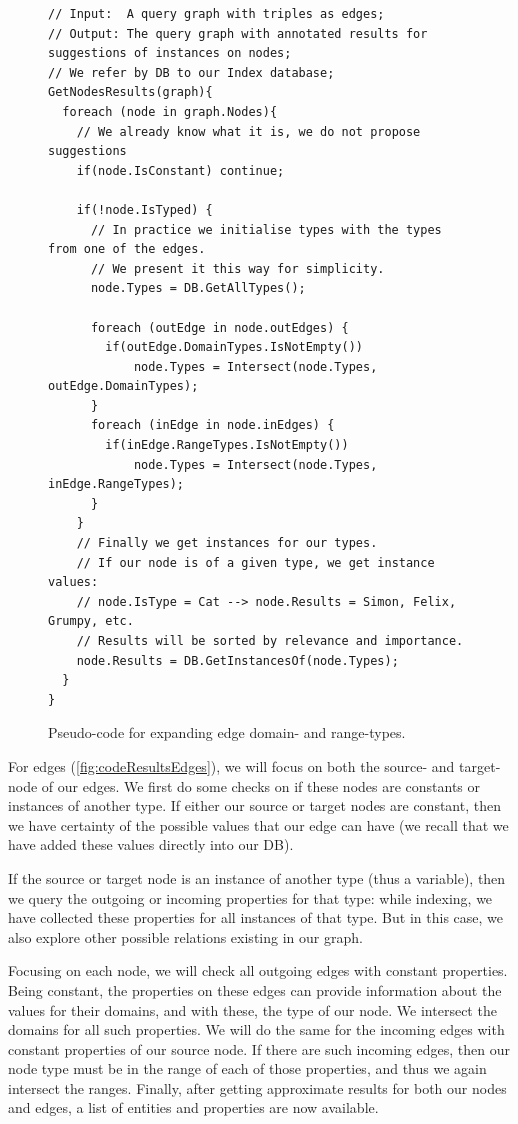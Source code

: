 \begin{example}
\begin{figure}[h]
\begin{verbatim}
// Input:  A query graph with triples as edges;
// Output: The query graph with annotated results for suggestions of instances on nodes;
// We refer by DB to our Index database;
GetNodesResults(graph){
  foreach (node in graph.Nodes){
    // We already know what it is, we do not propose suggestions
    if(node.IsConstant) continue;
        
    if(!node.IsTyped) {
      // In practice we initialise types with the types from one of the edges.
      // We present it this way for simplicity.
      node.Types = DB.GetAllTypes();
      
      foreach (outEdge in node.outEdges) {
        if(outEdge.DomainTypes.IsNotEmpty())
            node.Types = Intersect(node.Types, outEdge.DomainTypes);
      }
      foreach (inEdge in node.inEdges) {
        if(inEdge.RangeTypes.IsNotEmpty())
            node.Types = Intersect(node.Types, inEdge.RangeTypes);
      }
    }
    // Finally we get instances for our types.
    // If our node is of a given type, we get instance values:
    // node.IsType = Cat --> node.Results = Simon, Felix, Grumpy, etc.
    // Results will be sorted by relevance and importance.
    node.Results = DB.GetInstancesOf(node.Types);
  }
}
\end{verbatim}
\caption{Pseudo-code for expanding edge domain- and range-types.}
\label{fig:codeResultsNodes}
\end{figure}

For edges (\autoref{fig:codeResultsEdges}), we will focus on both the source- and target-node of our edges. We first do some checks on if these nodes are constants or instances of another type. If either our source or target nodes are constant, then we have certainty of the possible values that our edge can have (we recall that we have added these values directly into our DB).

If the source or target node is an instance of another type (thus a variable), then we query the outgoing or incoming properties for that type: while indexing, we have collected these properties for all instances of that type. But in this case, we also explore other possible relations existing in our graph.

Focusing on each node, we will check all outgoing edges with constant properties. Being constant, the properties on these edges can provide information about the values for their domains, and with these, the type of our node. We intersect the domains for all such properties. We will do the same for the incoming edges with constant properties of our source node. If there are such incoming edges, then our node type must be in the range of each of those properties, and thus we again intersect the ranges. Finally, after getting approximate results for both our nodes and edges, a list of entities and properties are now available. 


\end{example}
